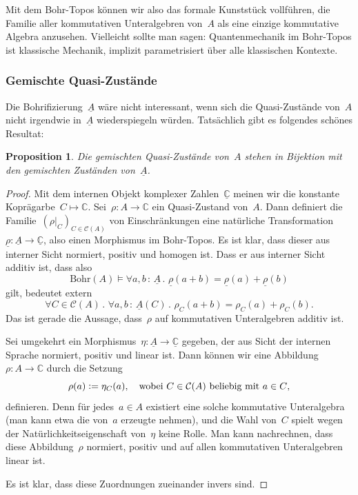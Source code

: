 \documentclass[a4paper,ngerman,12pt]{scrartcl}
\theoremstyle{definition}
\theoremstyle{plain}
\newtheorem{prop}[defn]{Proposition}
\theoremstyle{remark}
\newcommand{\CC}{\mathbb{C}}
\newcommand{\C}{\mathcal{C}}
\newcommand{\Bohr}{\mathrm{Bohr}}
\newcommand{\ul}[1]{\underline{#1}}
\renewcommand{\_}{\mathpunct{.}\,}
\newcommand{\?}{\,{:}\,}
\newcommand{\defeq}{\vcentcolon=}
\begin{document}
Mit dem Bohr-Topos können wir also das formale Kunststück vollführen, die
Familie aller kommutativen Unteralgebren von~$A$ als eine einzige kommutative
Algebra anzusehen. Vielleicht sollte man sagen: Quantenmechanik im Bohr-Topos
ist klassische Mechanik, implizit parametrisiert über alle klassischen
Kontexte.


\subsubsection*{Gemischte Quasi-Zustände}

Die Bohrifizierung~$\ul{A}$ wäre nicht interessant, wenn sich die Quasi-Zustände
von~$A$ nicht irgendwie in~$\ul{A}$ wiederspiegeln würden. Tatsächlich gibt es
folgendes schönes Resultat:

\begin{prop}Die gemischten Quasi-Zustände von~$A$ stehen in Bijektion mit den
gemischten Zuständen von~$\ul{A}$.\end{prop}
\begin{proof}Mit dem internen Objekt komplexer Zahlen~$\ul{\CC}$ meinen wir die
konstante Koprägarbe~$C \mapsto \CC$. Sei~$\rho : A \to \CC$ ein Quasi-Zustand
von~$A$. Dann definiert die Familie~$(\rho|_C)_{C \in \C(A)}$ von
Einschränkungen eine natürliche Transformation~$\ul{\rho} : \ul{A} \to
\ul{\CC}$, also einen Morphismus im Bohr-Topos. Es ist klar, dass dieser aus
interner Sicht normiert, positiv und homogen ist. Dass er aus interner Sicht
additiv ist, dass also
\[ \Bohr(A) \models \forall a,b\?\ul{A}\_ \ul{\rho}(a+b) = \ul{\rho}(a) +
\ul{\rho}(b) \]
gilt, bedeutet extern
\[ \forall C \in \C(A)\_ \forall a,b\?\ul{A}(C)\_ \rho_C(a+b) = \rho_C(a) +
\rho_C(b). \]
Das ist gerade die Aussage, dass~$\rho$ auf kommutativen Unteralgebren additiv
ist.

Sei umgekehrt ein Morphismus~$\eta : \ul{A} \to \ul{\CC}$ gegeben, der aus
Sicht der internen Sprache normiert, positiv und linear ist. Dann können wir
eine Abbildung~$\rho : A \to \CC$ durch die Setzung
\[ \rho(a) \defeq \eta_C(a), \quad\text{wobei~$C \in \C(A)$ beliebig mit~$a \in
C$}, \]
definieren. Denn für jedes~$a \in A$ existiert eine solche kommutative Unteralgebra (man kann
etwa die von~$a$ erzeugte nehmen), und die Wahl von~$C$ spielt wegen der
Natürlichkeitseigenschaft von~$\eta$ keine Rolle. Man kann nachrechnen, dass
diese Abbildung~$\rho$ normiert, positiv und auf allen kommutativen
Unteralgebren linear ist.

Es ist klar, dass diese Zuordnungen zueinander invers sind.\end{proof}
\end{document}
